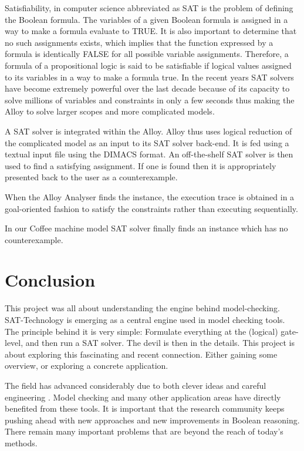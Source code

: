 \documentclass[a4paper,12pt]{report}
\begin{document}
Satisfiability, in computer science abbreviated as SAT is the problem of defining the Boolean formula. The variables of a given Boolean formula is assigned in a way to make a formula evaluate to TRUE. It is also important to determine that no such assignments exists, which implies that the function expressed by a formula is identically FALSE for all possible variable assignments. Therefore, a formula of a propositional logic is said to be satisfiable if logical values assigned to its variables in a way to make a formula true. In the recent years SAT solvers have become extremely powerful over the last decade because of its capacity to solve millions of variables and constraints in only a few seconds thus making the Alloy to solve larger scopes and more complicated models.

A SAT solver is integrated within the Alloy. Alloy thus uses logical reduction of the complicated model as an input to its SAT solver back-end. It is fed using a textual input file using the DIMACS format. An off-the-shelf SAT solver is then used to find a satisfying assignment\cite{Vaziri-Farahani2004}. If one is found then it is appropriately presented back to the user as a counterexample.

When the Alloy Analyser finds the instance, the execution trace is obtained in a goal-oriented fashion to satisfy the constraints rather than executing sequentially.

In our Coffee machine model SAT solver finally finds an instance which has no counterexample.

\chapter{Conclusion}

This project was all about understanding the engine behind model-checking. SAT-Technology is emerging as a central engine used in model checking tools. The principle behind it is very simple: Formulate everything at the (logical) gate-level, and then run a SAT solver. The devil is then in the details. This project is about exploring this fascinating and recent connection. Either gaining some overview, or exploring a concrete application.

The field has advanced considerably due to both clever ideas and careful engineering \cite{R.Bryant1986}. Model checking and many other application areas have directly benefited from these tools. It is important that the research community keeps pushing ahead with new approaches and new improvements in Boolean reasoning. There remain many important problems that are beyond the reach of today's methods.
\end{document}
